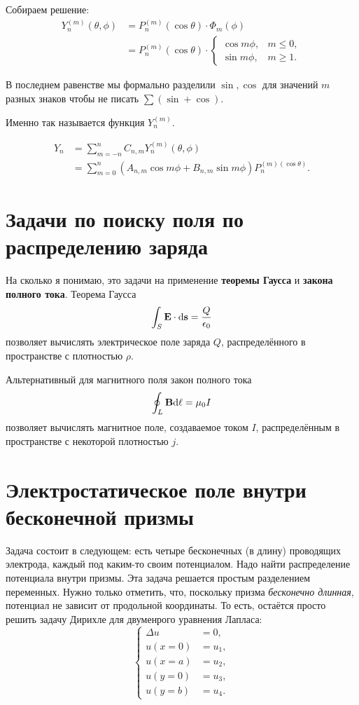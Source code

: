 \documentclass[12pt]{report}
\begin{document}
Собираем решение:
\begin{align*}
Y_n^{(m)}(\theta, \phi) &= P_n^{(m)} (\cos\theta) \cdot \Phi_m(\phi) \\
	&= P_n^{(m)}(\cos\theta)\cdot 
	\begin{cases}
	\cos m\phi, & m \le 0, \\
	\sin m\phi, & m \ge 1.
	\end{cases}
\end{align*}
\begin{rmk}
	В последнем равенстве мы формально разделили $\sin, \cos$ для значений $m$ разных знаков чтобы не писать $\sum(\sin + \cos)$.
\end{rmk}
\begin{rmk}
	Именно так называется функция $Y_n^{(m)}$.
\end{rmk}
\begin{rmk}
	\begin{align*}
	Y_n &= \sum_{m=-n}^n C_{n,m}Y_n^{(m)}(\theta, \phi) \\
	&= \sum_{m=0}^n\left(A_{n,m}\cos m\phi + B_{n,m}\sin m\phi\right) P_n^{(m)(\cos\theta)}.
	\end{align*}
\end{rmk}

\section{Задачи по поиску поля по распределению заряда}
На сколько я понимаю, это задачи на применение \textbf{теоремы Гаусса} и \textbf{закона полного тока}. 
Теорема Гаусса
\[
\int_S \mathbf{E}\cdot \mathrm d\mathbf{s} = \frac{Q}{\epsilon_0}
\]
позволяет вычислять электрическое поле заряда  $Q$, распределённого в пространстве с плотностью $\rho$.

Альтернативный для магнитного поля закон полного тока
\[
\oint_L\mathbf{B}\mathrm d\mathbf{\ell} = \mu_0 I
\]
позволяет вычислять магнитное поле, создаваемое током $I$, распределённым в пространстве с некоторой плотностью $j$.

\section{Электростатическое поле внутри бесконечной призмы}
Задача состоит в следующем: есть четыре бесконечных (в длину) проводящих электрода, каждый под каким-то своим потенциалом. Надо найти распределение потенциала внутри призмы.
Эта задача решается простым разделением переменных. Нужно только отметить, что, поскольку призма \textit{бесконечно длинная}, потенциал не зависит от продольной координаты. То есть, остаётся просто решить задачу Дирихле для двуменрого уравнения Лапласа:
\begin{equation*}
	\begin{cases}
		\Delta u &= 0, \\
		u(x=0) &= u_1, \\
		u(x=a) &= u_2, \\
		u(y=0) &= u_3, \\
		u(y=b) &= u_4.
	\end{cases}
\end{equation*}
\end{document}
